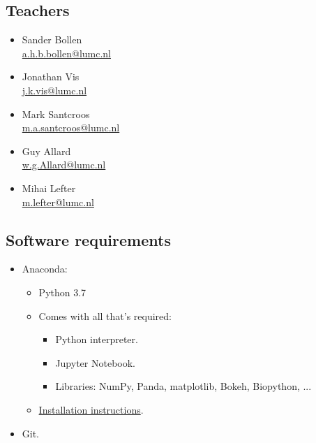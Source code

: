 \documentclass[slidestop]{beamer}
\begin{document}
\subsection{Teachers}
\begin{pframe}
 \begin{itemize}
  \item Sander Bollen \\
    \url{a.h.b.bollen@lumc.nl}
  \item Jonathan Vis \\
    \url{j.k.vis@lumc.nl}
  \item Mark Santcroos \\
    \url{m.a.santcroos@lumc.nl}
  \item Guy Allard \\
    \url{w.g.Allard@lumc.nl}
  \item Mihai Lefter\\
    \url{m.lefter@lumc.nl}
 \end{itemize}
\end{pframe}

\subsection{Software requirements}
\begin{pframe}
 \begin{itemize}
  \item Anaconda:
  \begin{itemize}
   \item Python 3.7
   \item Comes with all that's required:
   \begin{itemize}
    \item Python interpreter.
    \item Jupyter Notebook.
    \item Libraries: NumPy, Panda, matplotlib, Bokeh, Biopython, ...
   \end{itemize}
   \item \href{http://docs.anaconda.com/anaconda/install/}{Installation instructions}.
  \end{itemize}
  \item Git.
 \end{itemize}
\end{pframe}
\end{document}
